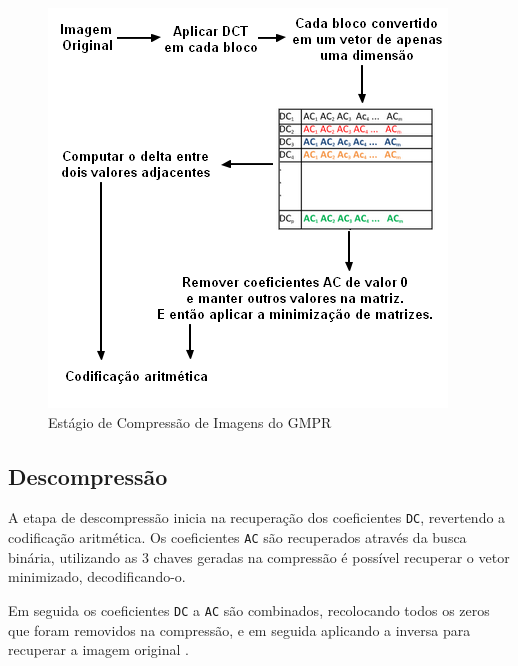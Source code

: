 \begin{figure}[t]
    \centering
    \includegraphics{Images/GMPRCompression.png}
    \caption{Estágio de Compressão de Imagens do GMPR}
    \label{fig:gmprcompression}
\end{figure}

\subsection{Descompressão}

A etapa de descompressão inicia na recuperação dos coeficientes \texttt{DC}, revertendo a codificação aritmética. Os coeficientes \texttt{AC} são recuperados através da busca binária, utilizando as 3 chaves geradas na compressão é possível recuperar o vetor minimizado, decodificando-o.

Em seguida os coeficientes \texttt{DC} a \texttt{AC} são combinados, recolocando todos os zeros que foram removidos na compressão, e em seguida aplicando a \dct inversa para recuperar a imagem original \cite{shu13715}.